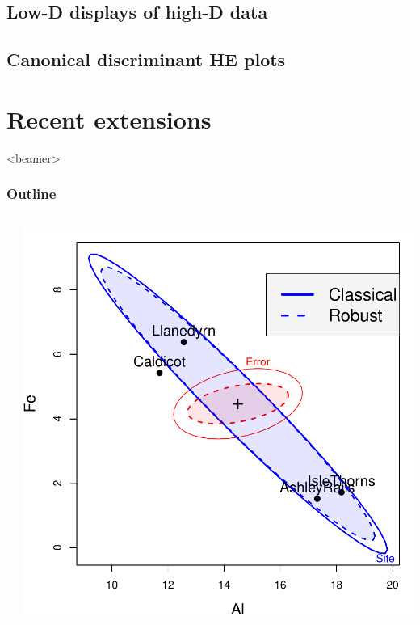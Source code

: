 \documentclass[10pt,t]{beamer}
\begin{document}
\subsection{Low-D displays of high-D data}

%
\subsection{Canonical discriminant HE plots}


\section{Recent extensions}
\begin{frame}<beamer>
  \frametitle{Outline}
	\begin{columns}[c]
	  \begin{column}{.6\textwidth}
	  \tableofcontents[currentsection]
	  \end{column}
	  \begin{column}{.4\textwidth}
	  \includegraphics[width=\textwidth]{figures/pottery-robust}
	  \end{column}
	\end{columns}
\end{frame}
\end{document}
